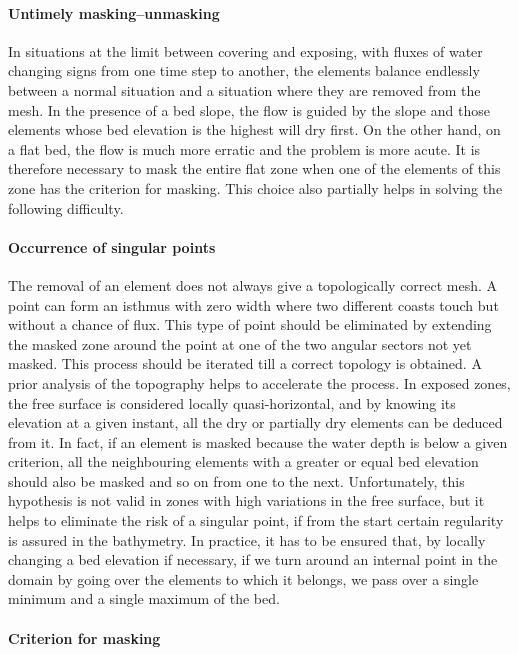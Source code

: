 \paragraph{Untimely masking--unmasking}

In situations at the limit between covering and exposing, with fluxes of water
changing signs from one time step to another, the elements balance endlessly
between a normal situation and a situation where they are removed from the
mesh. In the presence of a bed slope, the flow is guided by the slope and
those elements whose bed elevation is the highest will dry first. On the
other hand, on a flat bed, the flow is much more erratic and the problem is
more acute. It is therefore necessary to mask the entire flat zone when one of
the elements of this zone has the criterion for masking. This choice also
partially helps in solving the following difficulty.

\paragraph{Occurrence of singular points}

The removal of an element does not always give a topologically correct mesh. A
point can form an isthmus with zero width where two different coasts touch but
without a chance of flux. This type of point should be eliminated by extending
the masked zone around the point at one of the two angular sectors not yet
masked. This process should be iterated till a correct topology is obtained. A
prior analysis of the topography helps to accelerate the process. In exposed
zones, the free surface is considered locally quasi-horizontal, and by knowing
its elevation at a given instant, all the dry or partially dry elements can be
deduced from it. In fact, if an element is masked because the water depth is
below a given criterion, all the neighbouring elements with a greater or equal
bed elevation should also be masked and so on from one to the next.
Unfortunately, this hypothesis is not valid in zones with high variations in
the free surface, but it helps to eliminate the risk of a singular point, if
from the start certain regularity is assured in the bathymetry. In practice,
it has to be ensured that, by locally changing a bed elevation if
necessary, if we turn around an internal point in the domain by going over the
elements to which it belongs, we pass over a single minimum and a single
maximum of the bed.

\paragraph{Criterion for masking}

